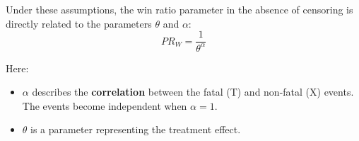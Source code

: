 \documentclass{article}
\begin{document}
Under these assumptions, the win ratio parameter in the absence of censoring is directly related to the parameters $\theta$ and $\alpha$:
\begin{equation}
PR_W = \frac{1}{\theta^\alpha}
\end{equation}

Here:
\begin{itemize}
    \item $\alpha$ describes the \textbf{correlation} between the fatal (T) and non-fatal (X) events. The events become independent when $\alpha=1$.
    \item $\theta$ is a parameter representing the treatment effect.
\end{itemize}
\end{document}
